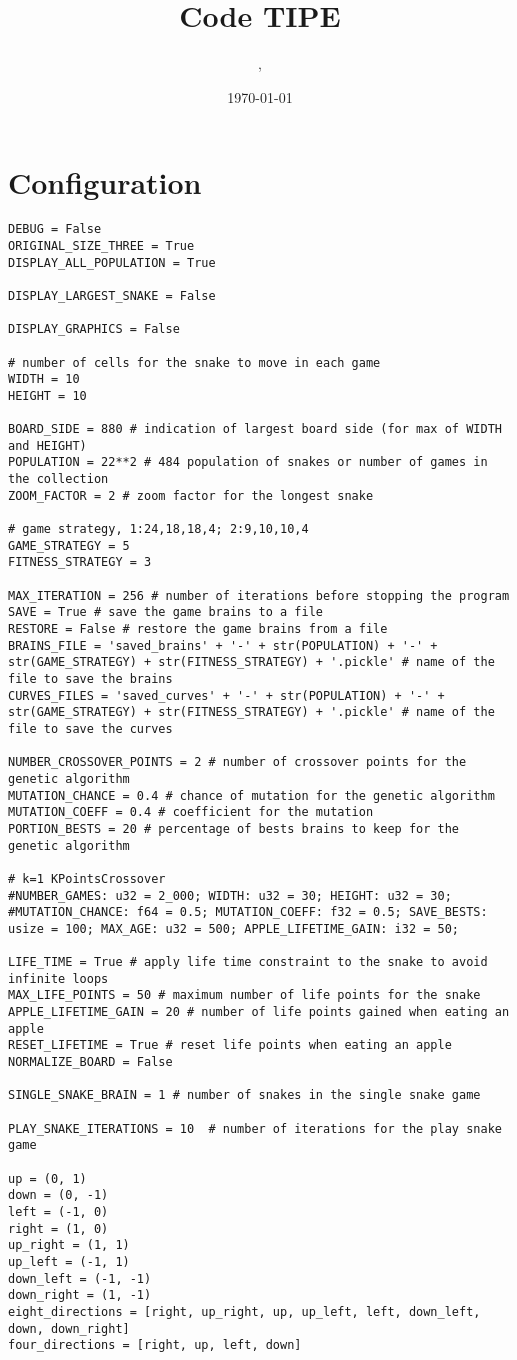 \documentclass[11pt,a4paper]{article}
\author{\monNom, \maClasse}
\title{Code TIPE}
\date{\today}
\makeatletter
\renewcommand{\maketitle}{
  \thispagestyle{empty}
  \begin{center}
  \shadowbox{\parbox{5in}{%
     \centering%
     \textrm{\textbf{\Large \@title}}\\
     \vspace{0.2cm}
     \textrm{\large \@author}\\
     \vspace{0.2cm}
     \textrm{\large \@date}
  }} 
  \end{center}
  \null
}
\makeatother
\begin{document}
\maketitle

\tableofcontents

\section{Configuration}

\begin{verbatim}
DEBUG = False
ORIGINAL_SIZE_THREE = True
DISPLAY_ALL_POPULATION = True

DISPLAY_LARGEST_SNAKE = False

DISPLAY_GRAPHICS = False

# number of cells for the snake to move in each game
WIDTH = 10
HEIGHT = 10

BOARD_SIDE = 880 # indication of largest board side (for max of WIDTH and HEIGHT)
POPULATION = 22**2 # 484 population of snakes or number of games in the collection
ZOOM_FACTOR = 2 # zoom factor for the longest snake

# game strategy, 1:24,18,18,4; 2:9,10,10,4
GAME_STRATEGY = 5
FITNESS_STRATEGY = 3

MAX_ITERATION = 256 # number of iterations before stopping the program
SAVE = True # save the game brains to a file
RESTORE = False # restore the game brains from a file
BRAINS_FILE = 'saved_brains' + '-' + str(POPULATION) + '-' + str(GAME_STRATEGY) + str(FITNESS_STRATEGY) + '.pickle' # name of the file to save the brains
CURVES_FILES = 'saved_curves' + '-' + str(POPULATION) + '-' + str(GAME_STRATEGY) + str(FITNESS_STRATEGY) + '.pickle' # name of the file to save the curves

NUMBER_CROSSOVER_POINTS = 2 # number of crossover points for the genetic algorithm
MUTATION_CHANCE = 0.4 # chance of mutation for the genetic algorithm
MUTATION_COEFF = 0.4 # coefficient for the mutation
PORTION_BESTS = 20 # percentage of bests brains to keep for the genetic algorithm

# k=1 KPointsCrossover
#NUMBER_GAMES: u32 = 2_000; WIDTH: u32 = 30; HEIGHT: u32 = 30;
#MUTATION_CHANCE: f64 = 0.5; MUTATION_COEFF: f32 = 0.5; SAVE_BESTS: usize = 100; MAX_AGE: u32 = 500; APPLE_LIFETIME_GAIN: i32 = 50;

LIFE_TIME = True # apply life time constraint to the snake to avoid infinite loops
MAX_LIFE_POINTS = 50 # maximum number of life points for the snake
APPLE_LIFETIME_GAIN = 20 # number of life points gained when eating an apple
RESET_LIFETIME = True # reset life points when eating an apple
NORMALIZE_BOARD = False

SINGLE_SNAKE_BRAIN = 1 # number of snakes in the single snake game

PLAY_SNAKE_ITERATIONS = 10  # number of iterations for the play snake game

up = (0, 1)
down = (0, -1)
left = (-1, 0)
right = (1, 0)
up_right = (1, 1)
up_left = (-1, 1)
down_left = (-1, -1)
down_right = (1, -1)
eight_directions = [right, up_right, up, up_left, left, down_left, down, down_right]
four_directions = [right, up, left, down]
\end{verbatim}
\end{document}
